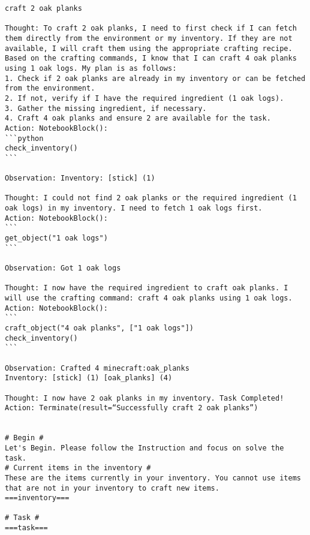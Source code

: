 \begin{tcolorbox}[title=Prompt on TextCraft, breakable, width=\textwidth,top=0mm]
\begin{Verbatim}[breaklines, fontsize=\footnotesize]
craft 2 oak planks

Thought: To craft 2 oak planks, I need to first check if I can fetch them directly from the environment or my inventory. If they are not available, I will craft them using the appropriate crafting recipe. Based on the crafting commands, I know that I can craft 4 oak planks using 1 oak logs. My plan is as follows:
1. Check if 2 oak planks are already in my inventory or can be fetched from the environment.
2. If not, verify if I have the required ingredient (1 oak logs).
3. Gather the missing ingredient, if necessary.
4. Craft 4 oak planks and ensure 2 are available for the task.
Action: NotebookBlock():
```python
check_inventory()
```

Observation: Inventory: [stick] (1) 

Thought: I could not find 2 oak planks or the required ingredient (1 oak logs) in my inventory. I need to fetch 1 oak logs first.
Action: NotebookBlock():
```
get_object("1 oak logs")
```

Observation: Got 1 oak logs

Thought: I now have the required ingredient to craft oak planks. I will use the crafting command: craft 4 oak planks using 1 oak logs.
Action: NotebookBlock():
```
craft_object("4 oak planks", ["1 oak logs"])
check_inventory()
```

Observation: Crafted 4 minecraft:oak_planks
Inventory: [stick] (1) [oak_planks] (4)

Thought: I now have 2 oak planks in my inventory. Task Completed!
Action: Terminate(result=“Successfully craft 2 oak planks”)


# Begin #
Let's Begin. Please follow the Instruction and focus on solve the task.
# Current items in the inventory #
These are the items currently in your inventory. You cannot use items that are not in your inventory to craft new items.
===inventory===

# Task #
===task===
\end{Verbatim}
\end{tcolorbox}

